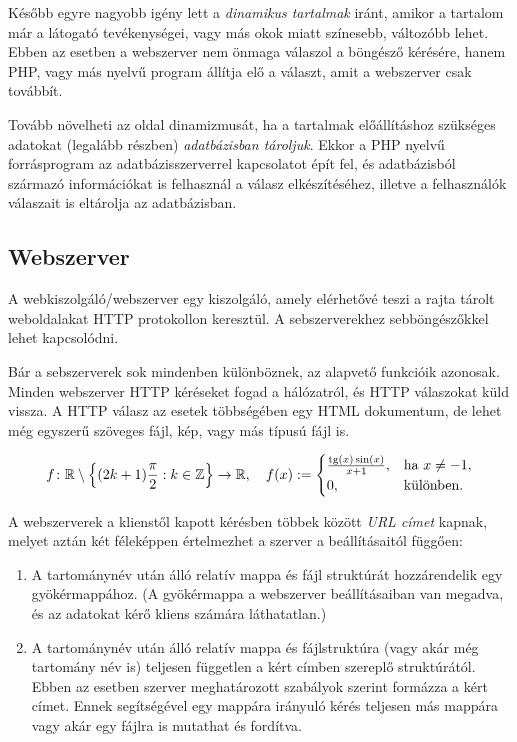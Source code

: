 \documentclass{thesis-ekf}
\DeclareMathOperator{\tg}{tg}
\theoremstyle{definition}
\begin{document}
Később egyre nagyobb igény lett a \emph{dinamikus tartalmak} iránt, amikor a tartalom már a látogató tevékenységei, vagy más okok miatt színesebb, változóbb lehet. Ebben az esetben a webszerver nem önmaga válaszol a böngésző kérésére, hanem PHP, vagy más nyelvű program állítja elő a választ, amit a webszerver csak továbbít.

Tovább növelheti az oldal dinamizmusát, ha a tartalmak előállításhoz szükséges adatokat (legalább részben) \emph{adatbázisban tároljuk}. Ekkor a PHP nyelvű forrásprogram az adatbázisszerverrel kapcsolatot épít fel, és adatbázisból származó információkat is felhasznál a válasz elkészítéséhez, illetve a felhasználók válaszait is eltárolja az adatbázisban.
\subsection{Webszerver}
A webkiszolgáló/webszerver egy kiszolgáló, amely elérhetővé teszi a rajta tárolt weboldalakat HTTP protokollon keresztül. A sebszerverekhez sebböngészőkkel lehet kapcsolódni.

Bár a sebszerverek sok mindenben különböznek, az alapvető funkcióik azonosak. Minden webszerver HTTP kéréseket fogad a hálózatról, és HTTP válaszokat küld vissza. A HTTP válasz az esetek többségében egy HTML dokumentum, de lehet még egyszerű szöveges fájl, kép, vagy más típusú fájl is.

\begin{equation}\label{eq:keplet}
f\colon\mathbb{R}\setminus\Bigl\{(2k+1)\frac{\pi}{2}:k\in\mathbb{Z}\Bigr\}\to\mathbb{R},\quad f(x):=
\begin{cases}
\frac{\tg(x)\sin(x)}{x+1},&\text{ha }x\ne -1,\\
0,&\text{különben.}
\end{cases}
\end{equation}

A webszerverek a klienstől kapott kérésben többek között \emph{URL címet} kapnak, melyet aztán két féleképpen értelmezhet a szerver a beállításaitól függően:
\begin{enumerate}
	\item A tartománynév után álló relatív mappa és fájl struktúrát hozzárendelik egy gyökérmappához. (A gyökérmappa a webszerver beállításaiban van megadva, és az adatokat kérő kliens számára láthatatlan.)
	\item A tartománynév után álló relatív mappa és fájlstruktúra (vagy akár még tartomány név is) teljesen független a kért címben szereplő struktúrától. Ebben az esetben szerver meghatározott szabályok szerint formázza a kért címet. Ennek segítségével egy mappára irányuló kérés teljesen más mappára vagy akár egy fájlra is mutathat és fordítva.
\end{enumerate}
\end{document}
